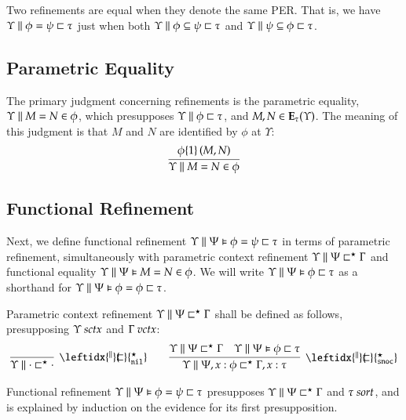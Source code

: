 \documentclass[11pt]{article}
\theoremstyle{definition}
\theoremstyle{remark}
\numberwithin{equation}{section}
\def\IModeColorName{MidnightBlue}
\def\OModeColorName{Maroon}
\def\IModeColorName{Black}
\def\OModeColorName{Black}
\newcommand\IMode[1]{{\color{\IModeColorName}{#1}}}
\newcommand\OMode[1]{{\color{\OModeColorName}{#1}}}
\newcommand\Member[2]{\IMode{#1}\in\IMode{#2}}
\newcommand\IsSort[1]{\IMode{#1}\ \textit{sort}}
\newcommand\IsVarCtx[1]{\IMode{#1}\ \textit{vctx}}
\newcommand\IsSymCtx[1]{\IMode{#1}\ \textit{sctx}}
\newcommand\Refines[3]{\IMode{#1}\parallel\IMode{#2}\sqsubset\OMode{#3}}
\newcommand\EqRefines[4]{\IMode{#1}\parallel\IMode{#2}=\IMode{#3}\sqsubset\OMode{#4}}
\newcommand\HRefines[4]{\IMode{#1}\parallel\IMode{#2}\vDash\IMode{#3}\sqsubset\OMode{#4}}
\newcommand\HEqRefines[5]{\IMode{#1}\parallel\IMode{#2}\vDash\IMode{#3}=\IMode{#4}\sqsubset\OMode{#5}}
\newcommand\PRefinesCtx[3]{\IMode{#1}\parallel\IMode{#2}\sqsubset^\star\OMode{#3}}
\newcommand\RMemEq[4]{\IMode{#1}\parallel\IMode{#2}=\IMode{#3}\in\IMode{#4}}
\newcommand\HRMemEq[5]{\IMode{#1}\parallel\IMode{#2}\vDash\IMode{#3}=\IMode{#4}\in\IMode{#5}}
\newcommand\SubRefines[4]{\IMode{#1}\parallel\IMode{#2}\subseteq\IMode{#3}\sqsubset\OMode{#4}}
\newcommand\Exprs{\mathbf{E}}
\begin{document}
Two refinements are equal when they denote the same PER. That is, we have
$\EqRefines{\Upsilon}{\phi}{\psi}{\tau}$ just when both
$\SubRefines{\Upsilon}{\phi}{\psi}{\tau}$ and
$\SubRefines{\Upsilon}{\psi}{\phi}{\tau}$.

\subsection{Parametric Equality}

The primary judgment concerning refinements is the parametric equality,
$\RMemEq{\Upsilon}{M}{N}{\phi}$, which presupposes
$\Refines{\Upsilon}{\phi}{\tau}$, and $\Member{M,N}{\Exprs_\tau(\Upsilon)}$.
The meaning of this judgment is that $M$ and $N$ are identified by $\phi$ at $\Upsilon$:
\[
  \infer{
    \RMemEq{\Upsilon}{M}{N}{\phi}
  }{
    \RefEquate{\phi}{1}{M}{N}
  }
\]

\subsection{Functional Refinement}

\newcommand\PRefinesCtxNil{\leftidx{^\parallel}{\!\!\sqsubset}{^\star_{\mathtt{nil}}}}
\newcommand\PRefinesCtxSnoc{\leftidx{^\parallel}{\!\!\sqsubset}{^\star_{\mathtt{snoc}}}}

Next, we define functional refinement
$\HEqRefines{\Upsilon}{\Psi}{\phi}{\psi}{\tau}$ in terms of parametric refinement,
simultaneously with parametric context refinement
$\PRefinesCtx{\Upsilon}{\Psi}{\Gamma}$ and functional equality
$\HRMemEq{\Upsilon}{\Psi}{M}{N}{\phi}$. We will write
$\HRefines{\Upsilon}{\Psi}{\phi}{\tau}$ as a shorthand for
$\HEqRefines{\Upsilon}{\Psi}{\phi}{\phi}{\tau}$.

\newcommand\DefPRefinesCtxNil[1]{
  \infer[\PRefinesCtxNil]{
    \PRefinesCtx{#1}{\cdot}{\cdot}
  }{
  }
}
\newcommand\DefPRefinesCtxSnoc[6]{
  \infer[\PRefinesCtxSnoc]{
    \PRefinesCtx{#1}{#2,#3:#4}{#5,#3:#6}
  }{
    \PRefinesCtx{#1}{#2}{#5} &
    \HRefines{#1}{#2}{#4}{#6}
  }
}

Parametric context refinement $\PRefinesCtx{\Upsilon}{\Psi}{\Gamma}$ shall be
defined as follows, presupposing $\IsSymCtx{\Upsilon}$ and
$\IsVarCtx{\Gamma}$:
\begin{gather*}
  \DefPRefinesCtxNil{\Upsilon}\qquad
  \DefPRefinesCtxSnoc{\Upsilon}{\Psi}{x}{\phi}{\Gamma}{\tau}
\end{gather*}

Functional refinement $\HEqRefines{\Upsilon}{\Psi}{\phi}{\psi}{\tau}$ presupposes
$\PRefinesCtx{\Upsilon}{\Psi}{\Gamma}$ and $\IsSort{\tau}$, and is explained by
induction on the evidence for its first presupposition.
\end{document}
